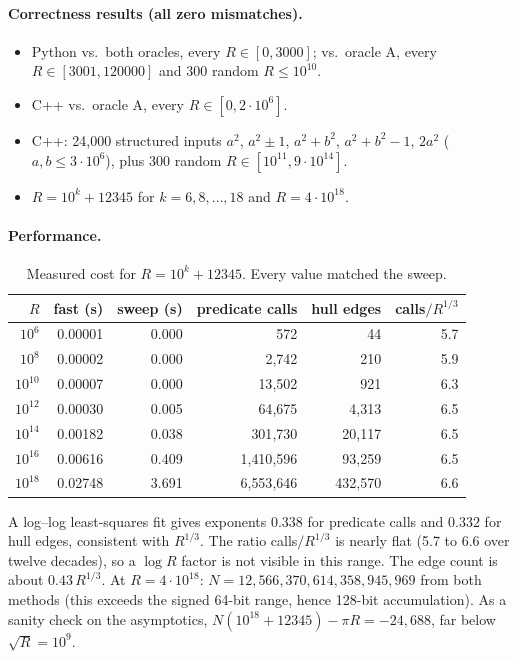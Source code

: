 \documentclass[11pt]{article}
\theoremstyle{remark}
\begin{document}
\paragraph{Correctness results (all zero mismatches).}
\begin{itemize}\setlength\itemsep{0pt}
\item Python vs.\ both oracles, every $R\in[0,3000]$; vs.\ oracle A, every $R\in[3001,120000]$ and 300 random $R\le10^{10}$.
\item C++ vs.\ oracle A, every $R\in[0,2\cdot10^6]$.
\item C++: 24{,}000 structured inputs $a^2$, $a^2\pm1$, $a^2+b^2$, $a^2+b^2-1$, $2a^2$ ($a,b\le3\cdot10^6$), plus 300 random $R\in[10^{11},9\cdot10^{14}]$.
\item $R=10^k+12345$ for $k=6,8,\dots,18$ and $R=4\cdot10^{18}$.
\end{itemize}

\paragraph{Performance.}
\begin{table}[h]\centering
\begin{tabular}{@{}rrrrrr@{}}
\toprule
$R$ & fast (s) & sweep (s) & predicate calls & hull edges & calls$/R^{1/3}$\\
\midrule
$10^{6}$  & 0.00001 & 0.000 & 572 & 44 & 5.7\\
$10^{8}$  & 0.00002 & 0.000 & 2{,}742 & 210 & 5.9\\
$10^{10}$ & 0.00007 & 0.000 & 13{,}502 & 921 & 6.3\\
$10^{12}$ & 0.00030 & 0.005 & 64{,}675 & 4{,}313 & 6.5\\
$10^{14}$ & 0.00182 & 0.038 & 301{,}730 & 20{,}117 & 6.5\\
$10^{16}$ & 0.00616 & 0.409 & 1{,}410{,}596 & 93{,}259 & 6.5\\
$10^{18}$ & 0.02748 & 3.691 & 6{,}553{,}646 & 432{,}570 & 6.6\\
\bottomrule
\end{tabular}
\caption{Measured cost for $R=10^k+12345$. Every value matched the sweep.}
\end{table}
A log--log least-squares fit gives exponents $0.338$ for predicate calls and $0.332$ for hull edges, consistent with $R^{1/3}$. The ratio calls$/R^{1/3}$ is nearly flat (5.7 to 6.6 over twelve decades), so a $\log R$ factor is not visible in this range. The edge count is about $0.43\,R^{1/3}$.
At $R=4\cdot10^{18}$: $N=12{,}566{,}370{,}614{,}358{,}945{,}969$ from both methods (this exceeds the signed 64-bit range, hence 128-bit accumulation).
As a sanity check on the asymptotics, $N(10^{18}+12345)-\pi R=-24{,}688$, far below $\sqrt R=10^9$.
\end{document}
